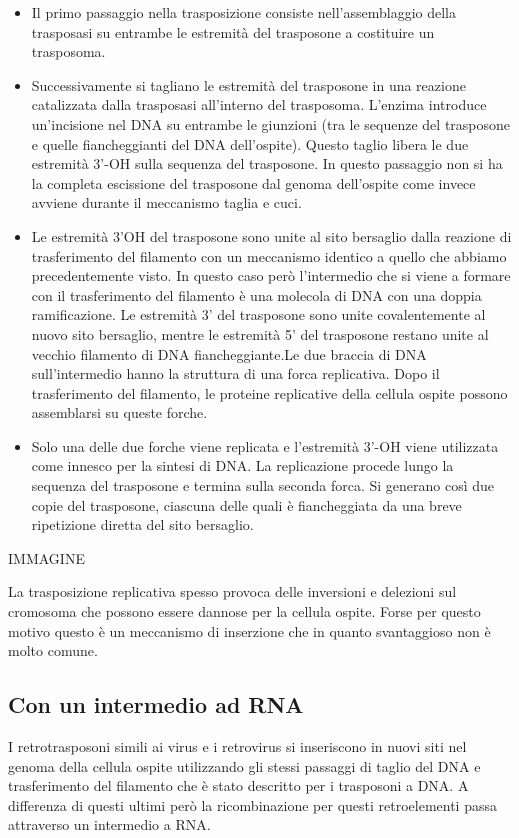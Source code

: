 \documentclass[11pt]{book}
\begin{document}
\begin{itemize}
\itemsep1pt\parskip0pt
\item
  Il primo passaggio nella trasposizione consiste nell'assemblaggio
  della trasposasi su entrambe le estremità del trasposone a
  costituire un trasposoma.
\item
  Successivamente si tagliano le estremità del trasposone in una
  reazione catalizzata dalla trasposasi all'interno del trasposoma.
  L'enzima introduce un'incisione nel DNA su entrambe le giunzioni
  (tra le sequenze del trasposone e quelle fiancheggianti del DNA
  dell'ospite). Questo taglio libera le due estremità 3'-OH sulla
  sequenza del trasposone. In questo passaggio non si ha la completa
  escissione del trasposone dal genoma dell'ospite come invece avviene
  durante il meccanismo taglia e cuci.
\item
  Le estremità 3'OH del trasposone sono unite al sito bersaglio dalla
  reazione di trasferimento del filamento con un meccanismo identico a
  quello che abbiamo precedentemente visto. In questo caso però
  l'intermedio che si viene a formare con il trasferimento del
  filamento è una molecola di DNA con una doppia ramificazione. Le
  estremità 3' del trasposone sono unite covalentemente al nuovo sito
  bersaglio, mentre le estremità 5' del trasposone restano unite al
  vecchio filamento di DNA fiancheggiante.Le due braccia di DNA
  sull'intermedio hanno la struttura di una forca replicativa. Dopo il
  trasferimento del filamento, le proteine replicative della cellula
  ospite possono assemblarsi su queste forche.
\item
  Solo una delle due forche viene replicata e l'estremità 3'-OH viene
  utilizzata come innesco per la sintesi di DNA. La replicazione
  procede lungo la sequenza del trasposone e termina sulla seconda
  forca. Si generano così due copie del trasposone, ciascuna delle
  quali è fiancheggiata da una breve ripetizione diretta del sito
  bersaglio.
\end{itemize}


IMMAGINE

La trasposizione replicativa spesso provoca delle inversioni e delezioni
sul cromosoma che possono essere dannose per la cellula ospite. Forse
per questo motivo questo è un meccanismo di inserzione che in quanto
svantaggioso non è molto comune.

\subsection{Con un intermedio ad RNA} 
I retrotrasposoni simili ai virus e
i retrovirus si inseriscono in nuovi siti nel genoma della cellula
ospite utilizzando gli stessi passaggi di taglio del DNA e
trasferimento del filamento che è stato descritto per i trasposoni a
DNA. A differenza di questi ultimi però la ricombinazione per questi
retroelementi passa attraverso un intermedio a RNA.
\end{document}
